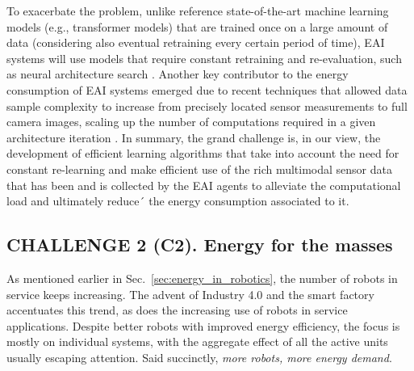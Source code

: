 To exacerbate the problem, unlike reference state-of-the-art machine learning models (e.g., transformer models) that are trained once on a large amount of data (considering also eventual retraining every certain period of time), EAI systems will use models that require constant retraining and re-evaluation, such as neural architecture search \cite{real2019regularized}. Another key contributor to the energy consumption of EAI systems emerged due to recent techniques that allowed data sample complexity to increase from precisely located sensor measurements to full camera images, scaling up the number of computations required in a given architecture iteration \cite{krizhevsky2012imagenet}. In summary, the grand challenge is, in our view, the development of efficient learning algorithms that take into account the need for constant re-learning and make efficient use of the rich multimodal sensor data that has been and is collected by the EAI agents to alleviate the computational load and ultimately reduce´ the energy consumption associated to it. %

\subsection{\textbf{CHALLENGE 2} (C2). Energy for the masses}\label{sec:robots_challenge}
As mentioned earlier in Sec.~\ref{sec:energy_in_robotics}, the number of robots in service keeps increasing. The advent of Industry 4.0 and the smart factory accentuates this trend, as does the increasing use of robots in service applications. Despite better robots with improved energy efficiency, the focus is mostly on individual systems, with the aggregate effect of all the active units usually escaping attention. Said succinctly, \emph{more robots, more energy demand}.

